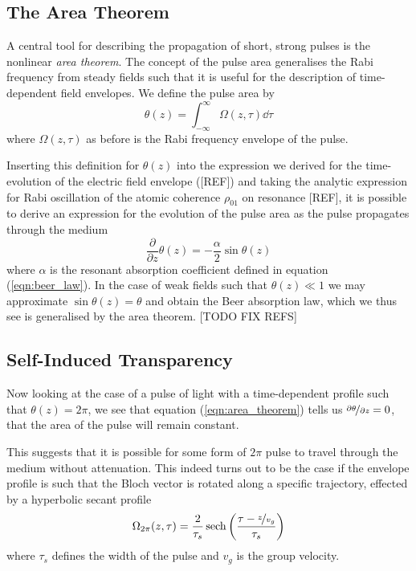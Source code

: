   \subsection{The Area Theorem}  

    A central tool for describing the propagation of short, strong pulses is the
    nonlinear \textit{area theorem}.\cite{McCall1969} The concept of the pulse
    area generalises the Rabi frequency from steady fields such that it is
    useful for the description of time-dependent field envelopes. We define the
    pulse area by
    \begin{equation}
      \theta(z) = \int^{\infty}_{-\infty} \Omega(z, \tau) \dd \tau
      \label{eqn:pulse_area}
    \end{equation}
    where $\Omega(z, \tau)$ as before is the Rabi frequency envelope of the
    pulse.

    Inserting this definition for $\theta(z)$ into the expression we derived for
    the time-evolution of the electric field envelope ([REF]) and taking the
    analytic expression for Rabi oscillation of the atomic coherence $\rho_{01}$
    on resonance [REF], it is possible to derive an expression for the evolution
    of the pulse area as the pulse propagates through the medium
    \begin{equation}
      \frac{\partial}{\partial z} \theta(z) = -\frac{\alpha}{2} \sin{\theta(z)}
      \label{eqn:area_theorem}
    \end{equation}
    where $\alpha$ is the resonant absorption coefficient defined in equation
    (\ref{eqn:beer_law}). In the case of weak fields such that $\theta(z) \ll 1$
    we may approximate $\sin{\theta(z)} = \theta$ and obtain the Beer absorption
    law, which we thus see is generalised by the area theorem. [TODO FIX REFS]

  \subsection{Self-Induced Transparency} 

    Now looking at the case of a pulse of light with a time-dependent profile
    such that $\theta(z) = 2\pi$, we see that equation (\ref{eqn:area_theorem})
    tells us $\nicefrac{\partial \theta}{\partial z} = 0$, \ie that the area of
    the pulse will remain constant.

    This suggests that it is possible for some form of $2\pi$ pulse to travel
    through the medium without attenuation. This indeed turns out to be the case
    if the envelope profile is such that the Bloch vector is rotated along
    a specific trajectory, effected by a hyperbolic secant profile
    \begin{equation}
      \Omega_{2\pi}(z, \tau) = \frac{2}{\tau_{s}} 
          \operatorname{sech}\left(\frac{\tau - \nicefrac{z}{v_g}}{\tau_s}\right)
      \label{eqn:sech_shape}
    \end{equation}
    where $\tau_s$ defines the width of the pulse and $v_g$ is the group
    velocity.


